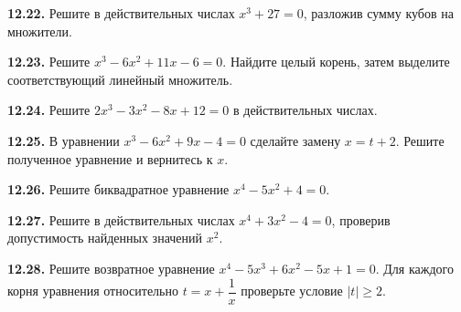 \noindent\begin{minipage}[t]{\linewidth}\textbf{12.22.} Решите в действительных числах \(x^3+27=0\), разложив сумму кубов на множители.\par\end{minipage}\par
\noindent\begin{minipage}[t]{\linewidth}\textbf{12.23.} Решите \(x^3-6x^2+11x-6=0\). Найдите целый корень, затем выделите соответствующий линейный множитель.\par\end{minipage}\par
\noindent\begin{minipage}[t]{\linewidth}\textbf{12.24.} Решите \(2x^3-3x^2-8x+12=0\) в действительных числах.\par\end{minipage}\par
\noindent\begin{minipage}[t]{\linewidth}\textbf{12.25.}\starmark{} В уравнении \(x^3-6x^2+9x-4=0\) сделайте замену \(x=t+2\). Решите полученное уравнение и вернитесь к \(x\).\par\end{minipage}\par
\noindent\begin{minipage}[t]{\linewidth}\textbf{12.26.} Решите биквадратное уравнение \(x^4-5x^2+4=0\).\par\end{minipage}\par
\noindent\begin{minipage}[t]{\linewidth}\textbf{12.27.} Решите в действительных числах \(x^4+3x^2-4=0\), проверив допустимость найденных значений \(x^2\).\par\end{minipage}\par
\noindent\begin{minipage}[t]{\linewidth}\textbf{12.28.}\starmark{} Решите возвратное уравнение \(x^4-5x^3+6x^2-5x+1=0\). Для каждого корня уравнения относительно \(t=x+\dfrac1x\) проверьте условие \(|t|\geq2\).\par\end{minipage}\par
\endgroup
